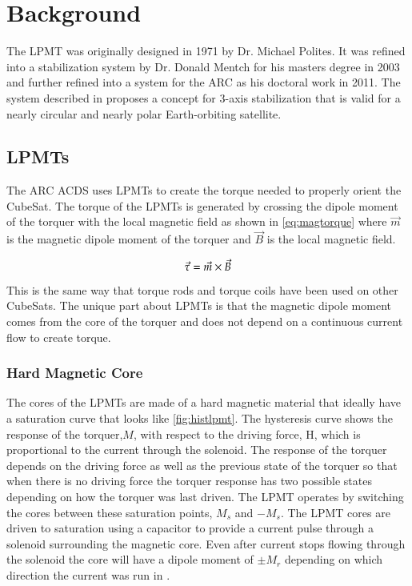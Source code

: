 

\chapter{Background}

\label{ch:BG}


The \ac{LPMT} was originally designed in 1971 by Dr. Michael Polites\cite{Polites71}. It was refined into a stabilization system by Dr. Donald Mentch for his masters degree in 2003 and further refined into a system for the \ac{ARC} as his doctoral work in 2011\cite{Mentch11}. The system described in \cite{Mentch11} proposes a concept for 3-axis stabilization that is valid for a nearly circular and nearly polar Earth-orbiting satellite.

\section{\aclp{LPMT}}

The \ac{ARC} \ac{ACDS} uses \acfp{LPMT} to create the torque needed to properly orient the CubeSat. The torque of the \acp{LPMT} is generated by crossing the dipole moment of the torquer with the local magnetic field as shown in \cref{eq:magtorque} where $\vec{m}$ is the magnetic dipole moment of the torquer and $\vec{B}$ is the local magnetic field.

\begin{equation}
    \vec{\tau} = \vec{m} \times \vec{B}
    \label{eq:magtorque}
\end{equation}

This is the same way that torque rods and torque coils have been used on other CubeSats. The unique part about \acp{LPMT} is that the magnetic dipole moment comes from the core of the torquer and does not depend on a continuous current flow to create torque.


\subsection{Hard Magnetic Core}

The cores of the \acp{LPMT} are made of a hard magnetic material that ideally have a saturation curve that looks like \cref{fig:histlpmt}. The hysteresis curve shows the response of the torquer,$M$, with respect to the driving force, H, which is proportional to the current through the solenoid. The response of the torquer depends on the driving force as well as the previous state of the torquer so that when there is no driving force the torquer response has two possible states depending on how the torquer was last driven. The \ac{LPMT} operates by switching the cores between these saturation points, $M_s$ and $-M_s$. The \ac{LPMT} cores are driven to saturation using a capacitor to provide a current pulse through a solenoid surrounding the magnetic core. Even after current stops flowing through the solenoid the core will have a dipole moment of $\pm M_r$ depending on which direction the current was run in \cite{Mentch11}.

